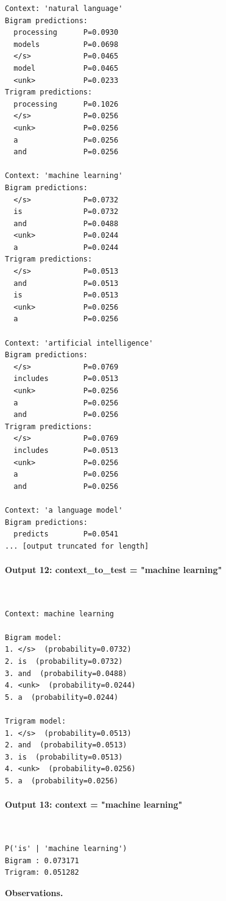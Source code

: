 \documentclass[12pt,a4paper,oneside]{report}
\begin{document}
\begin{Verbatim}[commandchars=\\\{\},breaklines=true,breakanywhere=true,fontsize=\scriptsize,frame=leftline,framesep=2mm,rulecolor=\color{gray}]
Context: 'natural language'
Bigram predictions:
  processing      P=0.0930
  models          P=0.0698
  </s>            P=0.0465
  model           P=0.0465
  <unk>           P=0.0233
Trigram predictions:
  processing      P=0.1026
  </s>            P=0.0256
  <unk>           P=0.0256
  a               P=0.0256
  and             P=0.0256

Context: 'machine learning'
Bigram predictions:
  </s>            P=0.0732
  is              P=0.0732
  and             P=0.0488
  <unk>           P=0.0244
  a               P=0.0244
Trigram predictions:
  </s>            P=0.0513
  and             P=0.0513
  is              P=0.0513
  <unk>           P=0.0256
  a               P=0.0256

Context: 'artificial intelligence'
Bigram predictions:
  </s>            P=0.0769
  includes        P=0.0513
  <unk>           P=0.0256
  a               P=0.0256
  and             P=0.0256
Trigram predictions:
  </s>            P=0.0769
  includes        P=0.0513
  <unk>           P=0.0256
  a               P=0.0256
  and             P=0.0256

Context: 'a language model'
Bigram predictions:
  predicts        P=0.0541
... [output truncated for length]
\end{Verbatim}
\paragraph{Output 12: context\_to\_test = "machine learning"}\mbox{}\\[-1ex]
\begin{Verbatim}[commandchars=\\\{\},breaklines=true,breakanywhere=true,fontsize=\scriptsize,frame=leftline,framesep=2mm,rulecolor=\color{gray}]
Context: machine learning

Bigram model:
1. </s>  (probability=0.0732)
2. is  (probability=0.0732)
3. and  (probability=0.0488)
4. <unk>  (probability=0.0244)
5. a  (probability=0.0244)

Trigram model:
1. </s>  (probability=0.0513)
2. and  (probability=0.0513)
3. is  (probability=0.0513)
4. <unk>  (probability=0.0256)
5. a  (probability=0.0256)
\end{Verbatim}
\paragraph{Output 13: context = "machine learning"}\mbox{}\\[-1ex]
\begin{Verbatim}[commandchars=\\\{\},breaklines=true,breakanywhere=true,fontsize=\scriptsize,frame=leftline,framesep=2mm,rulecolor=\color{gray}]
P('is' | 'machine learning')
Bigram : 0.073171
Trigram: 0.051282
\end{Verbatim}
\textbf{Observations.}
\end{document}

